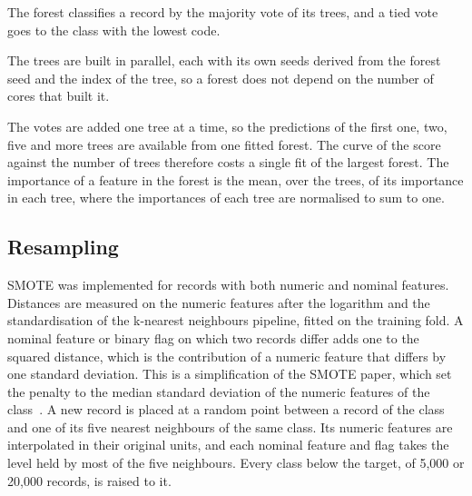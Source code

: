 \documentclass[conference,10pt]{IEEEtran}
\begin{document}
The forest classifies a record by the majority vote of its trees, and a tied
vote goes to the class with the lowest code.

The trees are built in parallel, each with its own seeds derived from the
forest seed and the index of the tree, so a forest does not depend on the
number of cores that built it.

The votes are added one tree at a time, so the predictions of the first one, two, five and more trees are available from one fitted forest. The curve of the
score against the number of trees therefore costs a single fit of the
largest forest. The importance of a feature in the forest is the mean, over
the trees, of its importance in each tree, where the importances of each
tree are normalised to sum to one.

\subsection{Resampling}
\label{subsec:impl_resampling}

SMOTE was implemented for records with both numeric and nominal features.
Distances are measured on the numeric features after the logarithm and the
standardisation of the k-nearest neighbours pipeline, fitted on the training
fold. A nominal feature or binary flag on which two records differ adds one
to the squared distance, which is the contribution of a numeric feature that
differs by one standard deviation. This is a simplification of the SMOTE
paper, which set the penalty to the median standard deviation of the
numeric features of the class~\cite{chawla2002smote}. A new record is placed
at a random point between a record of the class and one of its five nearest
neighbours of the same class. Its numeric features are interpolated in their
original units, and each nominal feature and flag takes the level held by
most of the five neighbours. Every class below the target, of 5,000 or
20,000 records, is raised to it.
\end{document}

